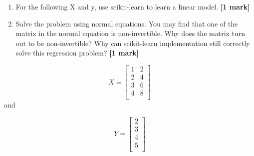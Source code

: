 \documentclass[colorlinks,linkcolor=true]{article}
\begin{document}
	\item 	
	\begin{enumerate}
		\item For the following X and y, use scikit-learn to learn a linear model. \textbf{[1 mark]}
		\item Solve the problem using normal equations. You may find that one of the matrix in the normal equation is non-invertible. Why does the matrix turn out to be non-invertible? Why can scikit-learn implementation still correctly solve this regression problem?  \textbf{[1 mark]}
	\end{enumerate}
	
$$X = \begin{bmatrix}


1       & 2 \\
2      &  4  \\
3      &  6  \\
4      &  8  \\

\end{bmatrix}$$
and 

$$Y = \begin{bmatrix}


2 \\
3  \\
4  \\
5  \\

\end{bmatrix}$$
\end{document}
